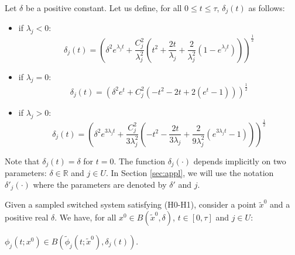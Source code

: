 \begin{definition}\label{def:4}
Let $\delta$ be a positive constant. Let us define, for all $0\leq t\leq \tau$,
$\delta_j(t)$ as follows:
\begin{itemize}
\item  if $\lambda_j <0$:
$$\delta_j(t)=\left(\delta^2 e^{\lambda_j t}+
 \frac{C_j^2}{\lambda_j^2}\left(t^2+\frac{2 t}{\lambda_j}+\frac{2}{\lambda_j^2}\left(1- e^{\lambda_j t} \right)\right)\right)^{\frac{1}{2}}$$
%

\item if $\lambda_j = 0:$
$$\delta_j(t)= \left( \delta^2 e^{t} + C_j^2 (- t^2 - 2t + 2 (e^t - 1)) \right)^\frac{1}{2}$$





\item if $\lambda_j > 0:$
$$\delta_j(t)=\left(\delta^2 e^{3\lambda_j t}+
\frac{C_j^2}{3\lambda_j^2}\left(-t^2-\frac{2t}{3\lambda_j}+\frac{2}{9\lambda_j^2}
\left(e^{3\lambda_j t}-1\right)\right)\right)^{\frac{1}{2}}$$
%
\end{itemize}
\end{definition}

Note that $\delta_j(t)=\delta$ for $t=0$. 
The function $\delta_j(\cdot)$ depends implicitly on two parameters: $\delta\in\mathbb{R}$ and $j\in U$. In Section \ref{sec:appl}, we will use the notation $\delta'_j(\cdot)$
where the parameters are denoted by $\delta'$ and $j$.


\begin{theorem}\label{th:1}

Given
a sampled switched system satisfying (H0-H1), consider
a point $\tilde{x}^0$
and a positive real $\delta$. 
We have,
for all $x^0\in B(\tilde{x}^0,\delta)$, $t\in [0,\tau]$ and  $j\in U$:

$\phi_j(t;x^0)\in B(\tilde{\phi}_j(t;\tilde{x}^0),\delta_j(t))$.
\end{theorem}



